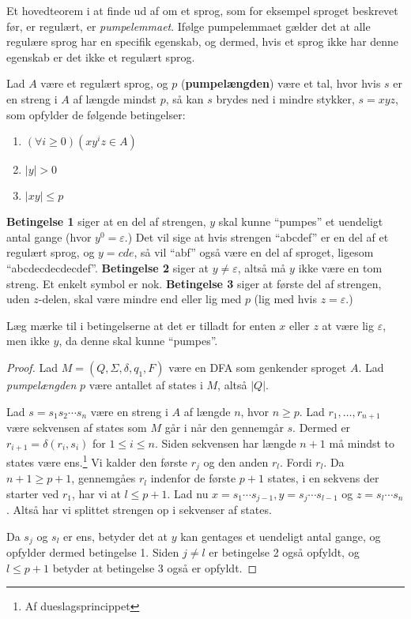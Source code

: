 Et hovedteorem i at finde ud af om et sprog, som for eksempel sproget beskrevet før, er regulært, er \textit{pumpelemmaet}. Ifølge pumpelemmaet gælder det at alle regulære sprog har en specifik egenskab, og dermed, hvis et sprog ikke har denne egenskab er det ikke et regulært sprog.

\begin{theorem}[Pumpelemmaet]
  Lad $A$ være et regulært sprog, og $p$ (\textbf{pumpelængden}) være et tal, hvor hvis $s$ er en streng i $A$ af længde mindst $p$, så kan $s$ brydes ned i mindre stykker, $s = xyz$, som opfylder de følgende betingelser:
  \begin{enumerate}
    \item $(\forall i \geq 0)(xy^{i}z \in A)$
    \item $|y| > 0$
    \item $|xy| \leq p$
  \end{enumerate}
\end{theorem}

\textbf{Betingelse 1} siger at en del af strengen, $y$ skal kunne ``pumpes'' et uendeligt antal gange (hvor $y^{0} = \varepsilon$.) Det vil sige at hvis strengen ``abcdef'' er en del af et regulært sprog, og $y = cde$, så vil ``abf'' også være en del af sproget, ligesom ``abcdecdecdecdef''.
\textbf{Betingelse 2} siger at $y \neq \varepsilon$, altså må $y$ ikke være en tom streng. Et enkelt symbol er nok.
\textbf{Betingelse 3} siger at første del af strengen, uden $z$-delen, skal være mindre end eller lig med $p$ (lig med hvis $z = \varepsilon$.)

Læg mærke til i betingelserne at det er tilladt for enten $x$ eller $z$ at være lig $\varepsilon$, men ikke $y$, da denne skal kunne ``pumpes''.

\begin{proof}
  Lad $M = (Q, \Sigma, \delta, q_{1}, F)$ være en DFA som genkender sproget $A$. Lad \textit{pumpelængden} $p$ være antallet af states i $M$, altså $|Q|$.

  Lad $s = s_{1}s_{2} \cdots s_{n}$ være en streng i $A$ af længde $n$, hvor $n \geq p$. Lad $r_{1}, \ldots, r_{n+1}$ være sekvensen af states som $M$ går i når den gennemgår $s$. Dermed er $r_{i+1} = \delta(r_i, s_{i})$ for $1 \leq i \leq n$. Siden sekvensen har længde $n+1$ må mindst to states være ens.\footnote{Af dueslagsprincippet} Vi kalder den første $r_{j}$ og den anden $r_{l}$. Fordi $r_{l}$. Da $n+1 \geq p+1$, gennemgåes $r_{l}$ indenfor de første $p+1$ states, i en sekvens der starter ved $r_{1}$, har vi at $l \leq p+1$. Lad nu $x = s_{1} \cdots s_{j-1}, y = s_{j} \cdots s_{l-1}$ og $z = s_{l} \cdots s_{n}$. Altså har vi splittet strengen op i sekvenser af states.

  Da $s_{j}$ og $s_{l}$ er ens, betyder det at $y$ kan gentages et uendeligt antal gange, og opfylder dermed betingelse 1. Siden $j \neq l$ er betingelse 2 også opfyldt, og $l \leq p+1$ betyder at betingelse 3 også er opfyldt.
\end{proof}


